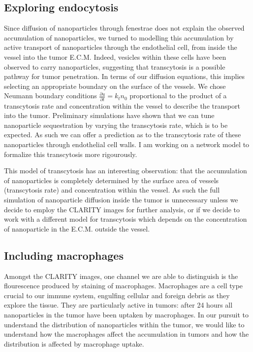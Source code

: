 \subsection{Exploring endocytosis}

Since diffusion of nanoparticles through fenestrae does not explain the observed accumulation of nanoparticles, we turned to modelling this accumulation by active transport of nanoparticles through the endothelial cell, from inside the vessel into the tumor E.C.M.
Indeed, vesicles within these cells have been observed to carry nanoparticles, suggesting that transcytosis is a possible pathway for tumor penetration.
In terms of our diffusion equations, this implies selecting an appropriate boundary on the surface of the vessels.
We chose Neumann boundary conditions $\frac{\partial u}{\partial t} = k_t n_0$ proportional to the product of a transcytosis rate and concentration within the vessel to describe the transport into the tumor.
Preliminary simulations have shown that we can tune nanoparticle sequestration by varying the transcytosis rate, which is to be expected.
As such we can offer a prediction as to the transcytosis rate of these nanoparticles through endothelial cell walls.
I am working on a network model to formalize this transcytosis more rigourously.

This model of transcytosis has an interesting observation: that the accumulation of nanoparticles is completely determined by the surface area of vessels (transcytosis rate) and concentration within the vessel.
As such the full simulation of nanoparticle diffusion inside the tumor is unnecessary unless we decide to employ the CLARITY images for further analysis, or if we decide to work with a different model for transcytosis which depends on the concentration of nanoparticle in the E.C.M. outside the vessel.

\subsection{Including macrophages}


Amongst the CLARITY images, one channel we are able to distinguish is the flourescence produced by staining of macrophages.
Macrophages are a cell type crucial to our immune system, engulfing cellular and foreign debris as they explore the tissue.
They are particularly active in tumors: after 24 hours all nanoparticles in the tumor have been uptaken by macrophages.
In our pursuit to understand the distribution of nanoparticles within the tumor, we would like to understand how the macrophages affect the accumulation in tumors and how the distribution is affected by macrophage uptake.

